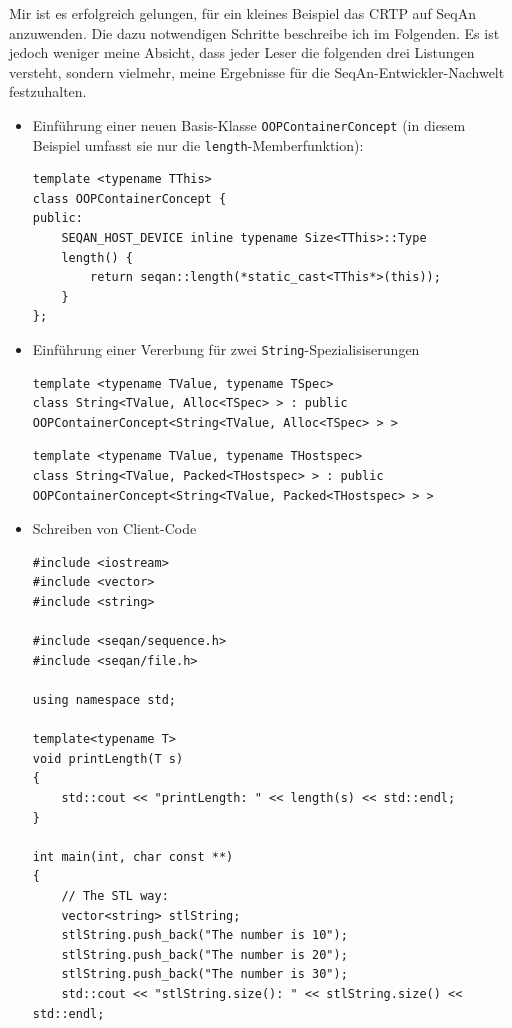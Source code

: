 Mir ist es erfolgreich gelungen, für ein kleines Beispiel das CRTP auf SeqAn anzuwenden. Die dazu notwendigen Schritte beschreibe ich im Folgenden. Es ist jedoch weniger meine Absicht, dass jeder Leser die folgenden drei Listungen versteht, sondern vielmehr, meine Ergebnisse für die SeqAn-Entwickler-Nachwelt festzuhalten.
\begin{itemize}
  \item Einführung einer neuen Basis-Klasse \texttt{OOPContainerConcept} (in diesem Beispiel umfasst sie nur die \texttt{length}-Memberfunktion):
  \begin{verbatim}
template <typename TThis>
class OOPContainerConcept {
public:
    SEQAN_HOST_DEVICE inline typename Size<TThis>::Type
    length() {
        return seqan::length(*static_cast<TThis*>(this));
    }
};
  \end{verbatim} 
  
  \item Einführung einer Vererbung für zwei \texttt{String}-Spezialisiserungen
  \begin{verbatim}
template <typename TValue, typename TSpec>
class String<TValue, Alloc<TSpec> > : public OOPContainerConcept<String<TValue, Alloc<TSpec> > > 
  \end{verbatim}
  \begin{verbatim}
template <typename TValue, typename THostspec>
class String<TValue, Packed<THostspec> > : public OOPContainerConcept<String<TValue, Packed<THostspec> > >
  \end{verbatim}
  
  \item Schreiben von Client-Code
\begin{center}
\begin{verbatim}
#include <iostream>
#include <vector>
#include <string>

#include <seqan/sequence.h>
#include <seqan/file.h>

using namespace std;

template<typename T>
void printLength(T s)
{
    std::cout << "printLength: " << length(s) << std::endl;
}

int main(int, char const **)
{
    // The STL way:
    vector<string> stlString;
    stlString.push_back("The number is 10");
    stlString.push_back("The number is 20");
    stlString.push_back("The number is 30");
    std::cout << "stlString.size(): " << stlString.size() << std::endl;


\end{verbatim}
\end{center}
\end{itemize}
